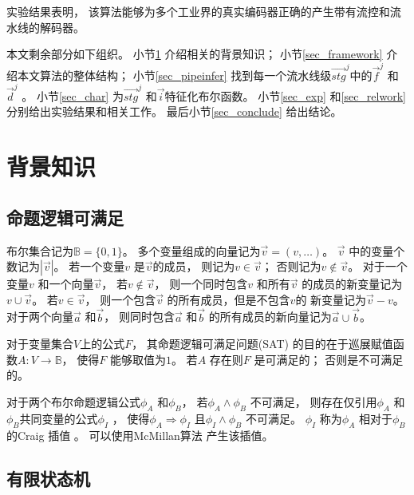 实验结果表明，
该算法能够为多个工业界的真实编码器正确的产生带有流控和流水线的解码器。

本文剩余部分如下组织。
小节\ref{sec_prem} 介绍相关的背景知识；
小节\ref{sec_framework} 介绍本文算法的整体结构；
小节\ref{sec_pipeinfer} 找到每一个流水线级$\vec{stg}^j$中的$\vec{f}^j$ 和$\vec{d}^j$ 。
小节\ref{sec_char} 为$\vec{stg}^j$ 和$\vec{i}$特征化布尔函数。
小节\ref{sec_exp} 和\ref{sec_relwork} 分别给出实验结果和相关工作。
最后小节\ref{sec_conclude} 给出结论。


\section{背景知识}\label{sec_prem}




\subsection{命题逻辑可满足}\label{subsec_SAT}
布尔集合记为$\mathbb{B}=\{0,1\}$。
多个变量组成的向量记为$\vec{v}=(v,\dots)$。
$\vec{v}$ 中的变量个数记为$|\vec{v}|$。
若一个变量$v$ 是$\vec{v}$的成员，
则记为$v\in\vec{v}$；
否则记为$v\notin\vec{v}$。
对于一个变量$v$ 和一个向量$\vec{v}$，
若$v\notin\vec{v}$，
则一个同时包含$v$ 和所有$\vec{v}$ 的成员的新变量记为$v\cup\vec{v}$。
若$v\in \vec{v}$，
则一个包含$\vec{v}$ 的所有成员，但是不包含$v$的
新变量记为$\vec{v}-v$。
对于两个向量$\vec{a}$ 和$\vec{b}$，
则同时包含$\vec{a}$ 和$\vec{b}$ 的所有成员的新向量记为$\vec{a}\cup\vec{b}$。

对于变量集合$V$上的公式$F$，
其命题逻辑可满足问题(SAT)
的目的在于巡展赋值函数$A:V\to \mathbb{B}$，
使得$F$ 能够取值为$1$。
若$A$ 存在则$F$ 是可满足的；
否则是不可满足的。

对于两个布尔命题逻辑公式$\phi_A$ 和$\phi_B$，
若$\phi_A\wedge \phi_B$ 不可满足，
则存在仅引用$\phi_A$ 和$\phi_B$共同变量的公式$\phi_I$ ，
使得$\phi_A\Rightarrow \phi_I$
且$\phi_I\wedge \phi_B$ 不可满足。
$\phi_I$ 称为$\phi_A$ 相对于$\phi_B$的Craig 插值\cite{Craig} 。
可以使用McMillan算法 \cite{interp_McMillan} 产生该插值。




\subsection{有限状态机}\label{subsec_fsm}



